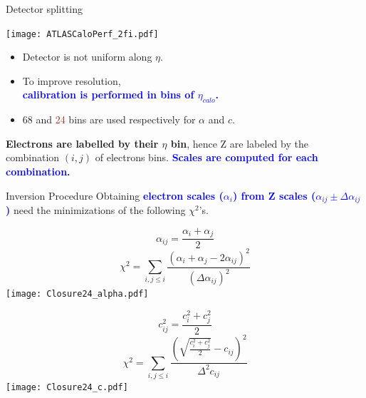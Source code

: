 \begin{frame}{Detector splitting}
  \begin{minipage}{0.49\linewidth}
    \texttt{[image: ATLASCaloPerf\_2fi.pdf]}
  \end{minipage}
  \begin{minipage}{0.49\linewidth}
    \begin{itemize}
    \item Detector is not uniform along $\eta$.
    \item To improve resolution, \\ \textcolor{blue}{\bf calibration is performed in bins of $\eta_{calo}$.}
    \item 68 and \textcolor{brown}{24} bins are used respectively for $\alpha$ and $c$.\\
    \end{itemize}
  \end{minipage}
  \vfill
  {\bf Electrons are labelled by their $\eta$ bin}, hence Z are labeled by the combination $(i, j)$ of electrons bins.
  \textcolor{blue}{\bf Scales are computed for each combination.}
\end{frame}


\begin{frame}{Inversion Procedure}
Obtaining \textcolor{blue}{\bf electron scales ($\alpha_i$) from Z scales ($\alpha_{ij} \pm \Delta\alpha_{ij}$)} need the minimizations of the following $\chi^2$'s.\\
\begin{minipage}{0.49\linewidth}
  $$\alpha_{ij} = \frac{\alpha_i+\alpha_j}{2}$$
  $$\chi^2 = \sum \limits_{i, j\leq i} \frac{ (\alpha_i + \alpha_j - 2\alpha_{ij})^2 }{(\Delta\alpha_{ij})^2}$$
  \texttt{[image: Closure24\_alpha.pdf]}
\end{minipage}
\hfill
\begin{minipage}{0.49\linewidth}
  $$c_{ij}^2 = \frac{c^2_i + c_j^2}{2}$$
  $$\chi^2 = \sum \limits_{i, j\leq i} \frac{ (\sqrt{\frac{c_i^2 + c_j^2}{2}} - c_{ij})^2 }{\Delta^2 c_{ij}}$$
  \texttt{[image: Closure24\_c.pdf]}
\end{minipage}

\end{frame}


